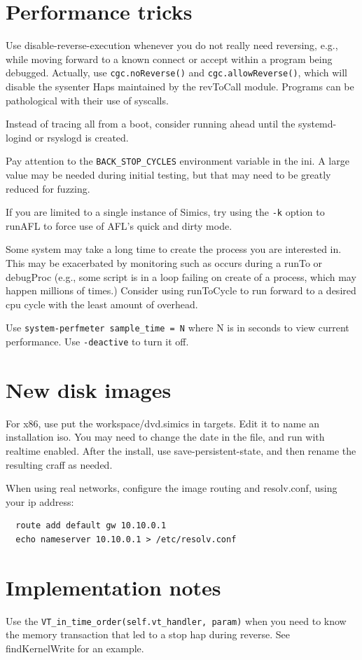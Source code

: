 \documentclass[titlepage]{article}
\begin{document}
\begin{appendices}
\section{Performance tricks}
Use disable-reverse-execution whenever you do not really need reversing, e.g., while moving forward to a known connect or accept
within a program being debugged.  Actually, use {\tt cgc.noReverse()} and {\tt cgc.allowReverse()}, which will disable the sysenter
Haps maintained by the revToCall module.  Programs can be pathological with their use of syscalls.

Instead of tracing all from a boot, consider running ahead until the systemd-logind or rsyslogd is created.

Pay attention to the {\tt BACK\_STOP\_CYCLES} environment variable in the ini.  A large value may be needed during initial testing,
but that may need to be greatly reduced for fuzzing.

If you are limited to a single instance of Simics, try using the {\tt -k} option to runAFL to force use of AFL's quick and dirty mode.

Some system may take a long time to create the process you are interested in.  This may be exacerbated by monitoring such as occurs during
a runTo or debugProc (e.g., some script is in a loop failing on create of a process, which may happen millions of times.)  Consider using
runToCycle to run forward to a desired cpu cycle with the least amount of overhead.

Use {\tt system-perfmeter sample\_time = N} where N is in seconds to view current performance.  Use {\tt -deactive} to turn it off.

\section{New disk images}
For x86, use put the workspace/dvd.simics in targets.  Edit it to name an installation iso.  You may need to change the date in
the file, and run with realtime enabled.  After the install, use save-persistent-state, and then rename the resulting craff as
needed.

When using real networks, configure the image routing and resolv.conf, using your ip address:
\begin{verbatim}
  route add default gw 10.10.0.1
  echo nameserver 10.10.0.1 > /etc/resolv.conf
\end{verbatim}


\section{Implementation notes}
Use the {\tt VT\_in\_time\_order(self.vt\_handler, param)} when you need to know the memory transaction that
led to a stop hap during reverse.  See findKernelWrite for an example.


\end{appendices}
\end{document}
